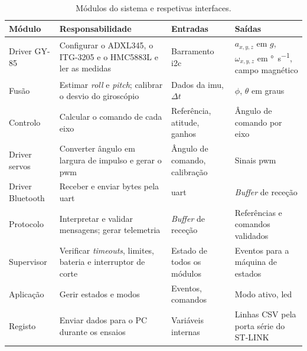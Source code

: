 \begin{table}[H]
\centering\small
\caption{Módulos do sistema e respetivas interfaces.}
\begin{tabularx}{\textwidth}{>{\raggedright\arraybackslash}p{2.3cm}YYY}
\toprule
Módulo & Responsabilidade & Entradas & Saídas\\\midrule
Driver GY-85 & Configurar o ADXL345, o ITG-3205 e o HMC5883L e ler as medidas & Barramento \acrshort{i2c} & $a_{x,y,z}$ em $g$, $\omega_{x,y,z}$ em \si{\degree\per\second}, campo magnético\\
Fusão & Estimar \textit{roll} e \textit{pitch}; calibrar o desvio do giroscópio & Dados da \acrshort{imu}, $\Delta t$ & $\phi$, $\theta$ em graus\\
Controlo & Calcular o comando de cada eixo & Referência, atitude, ganhos & Ângulo de comando por eixo\\
Driver servos & Converter ângulo em largura de impulso e gerar o \acrshort{pwm} & Ângulo de comando, calibração & Sinais \acrshort{pwm}\\
Driver Bluetooth & Receber e enviar bytes pela \acrshort{uart} & \acrshort{uart} & \textit{Buffer} de receção\\
Protocolo & Interpretar e validar mensagens; gerar telemetria & \textit{Buffer} de receção & Referências e comandos validados\\
Supervisor & Verificar \textit{timeouts}, limites, bateria e interruptor de corte & Estado de todos os módulos & Eventos para a máquina de estados\\
Aplicação & Gerir estados e modos & Eventos, comandos & Modo ativo, \acrshort{led}\\
Registo & Enviar dados para o PC durante os ensaios & Variáveis internas & Linhas CSV pela porta série do ST-LINK\\
\bottomrule
\end{tabularx}
\label{tab:modulos}
\end{table}
